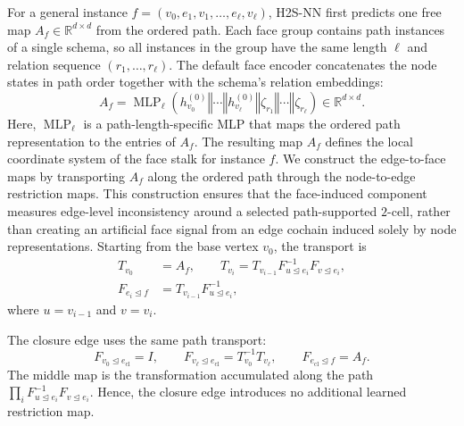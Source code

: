 \documentclass[sigconf,anonymous,review]{acmart}
\newcommand{\R}{\mathbb{R}}
\newcommand{\method}{\textsc{H2S-NN}}
\newcommand{\transpose}{\mathsf{T}}
\newcommand{\concat}{\mathbin\Vert}
\begin{document}
For a general instance \(f=(v_0,e_1,v_1,\ldots,e_\ell,v_\ell)\), \method{} first predicts one free
map \(A_f\in\R^{d\times d}\) from the ordered path.  Each face group contains path instances of a single schema, so all instances
in the group have the same length \(\ell\) and relation sequence
\((r_1,\ldots,r_\ell)\).  The default face encoder concatenates the node states in path order
together with the schema's relation embeddings:
\begin{equation}
A_f
=
\operatorname{MLP}_{\ell}\!\left(
  h_{v_0}^{(0)}\concat\cdots\concat h_{v_\ell}^{(0)}
  \concat \zeta_{r_1}\concat\cdots\concat \zeta_{r_\ell}
\right)
\in\mathbb{R}^{d\times d}.
  \label{eq:face-map}
\end{equation}
Here, \(\operatorname{MLP}_{\ell}\) is a path-length-specific MLP that maps
the ordered path representation to the entries of \(A_f\). The resulting map
\(A_f\) defines the local coordinate system of the face stalk for instance
\(f\).
We construct the edge-to-face maps by transporting \(A_f\) along the ordered
path through the node-to-edge restriction maps. This construction ensures
that the face-induced component measures edge-level inconsistency around a
selected path-supported \(2\)-cell, rather than creating an artificial face
signal from an edge cochain induced solely by node representations. Starting
from the base vertex \(v_0\), the transport is
\begin{equation}
  \begin{aligned}
  T_{v_0}&=A_f,
  \qquad
  T_{v_i}=T_{v_{i-1}}F_{u\unlhd e_i}^{-1}F_{v\unlhd e_i},\\
  F_{e_i\unlhd f}&=T_{v_{i-1}}F_{u\unlhd e_i}^{-1},
  \end{aligned}
  \label{eq:transport}
\end{equation}
where \(u=v_{i-1}\) and \(v=v_i\).  


The closure edge uses the same path transport:
\begin{equation}
  F_{v_0\unlhd e_{\mathrm{cl}}}=I,
  \qquad
  F_{v_\ell\unlhd e_{\mathrm{cl}}}=T_{v_0}^{-1}T_{v_\ell},
  \qquad
  F_{e_{\mathrm{cl}}\unlhd f}=A_f .
  \label{eq:closure-maps}
\end{equation}
The middle map is the transformation accumulated along the path \(\prod_i F_{u\unlhd e_i}^{-1}F_{v\unlhd e_i}\).  Hence, the closure edge introduces no additional learned restriction map.
\end{document}
